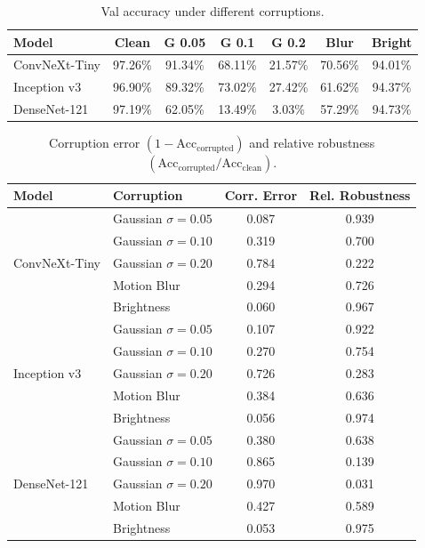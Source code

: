 \documentclass[11pt,a4paper]{article}
\begin{document}
\begin{table}[H]
\centering
\caption{Val accuracy under different corruptions.}
\label{tab:corruption_acc}
\begin{tabular}{lcccccc}
\toprule
\textbf{Model} & \textbf{Clean} & \textbf{G 0.05} & \textbf{G 0.1} & \textbf{G 0.2} & \textbf{Blur} & \textbf{Bright} \\
\midrule
ConvNeXt-Tiny  & 97.26\% & 91.34\% & 68.11\% & 21.57\% & 70.56\% & 94.01\% \\
Inception v3   & 96.90\% & 89.32\% & 73.02\% & 27.42\% & 61.62\% & 94.37\% \\
DenseNet-121   & 97.19\% & 62.05\% & 13.49\% &  3.03\% & 57.29\% & 94.73\% \\
\bottomrule
\end{tabular}
\end{table}

\begin{table}[H]
\centering
\caption{Corruption error $(1 - \text{Acc}_{\text{corrupted}})$ and relative robustness $(\text{Acc}_{\text{corrupted}} / \text{Acc}_{\text{clean}})$.}
\label{tab:corruption_metrics}
\begin{tabular}{llcc}
\toprule
\textbf{Model} & \textbf{Corruption} & \textbf{Corr. Error} & \textbf{Rel. Robustness} \\
\midrule
\multirow{5}{*}{ConvNeXt-Tiny}
  & Gaussian $\sigma=0.05$ & 0.087 & 0.939 \\
  & Gaussian $\sigma=0.10$ & 0.319 & 0.700 \\
  & Gaussian $\sigma=0.20$ & 0.784 & 0.222 \\
  & Motion Blur            & 0.294 & 0.726 \\
  & Brightness             & 0.060 & 0.967 \\
\midrule
\multirow{5}{*}{Inception v3}
  & Gaussian $\sigma=0.05$ & 0.107 & 0.922 \\
  & Gaussian $\sigma=0.10$ & 0.270 & 0.754 \\
  & Gaussian $\sigma=0.20$ & 0.726 & 0.283 \\
  & Motion Blur            & 0.384 & 0.636 \\
  & Brightness             & 0.056 & 0.974 \\
\midrule
\multirow{5}{*}{DenseNet-121}
  & Gaussian $\sigma=0.05$ & 0.380 & 0.638 \\
  & Gaussian $\sigma=0.10$ & 0.865 & 0.139 \\
  & Gaussian $\sigma=0.20$ & 0.970 & 0.031 \\
  & Motion Blur            & 0.427 & 0.589 \\
  & Brightness             & 0.053 & 0.975 \\
\bottomrule
\end{tabular}
\end{table}
\end{document}
